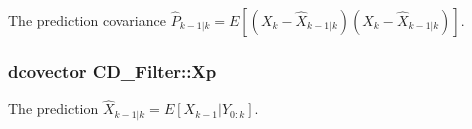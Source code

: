 The prediction covariance $ \hat{P}_{k-1|k}=E[(X_k-\hat{X}_{k-1|k})(X_k-\hat{X}_{k-1|k}) ] $. 

\hypertarget{class_c_d___filter_a72ca0f05fe1359cf61ec5db0e1a3282}{
\subsubsection[{Xp}]{\setlength{\rightskip}{0pt plus 5cm}dcovector {\bf CD\_\-Filter::Xp}}}
\label{class_c_d___filter_a72ca0f05fe1359cf61ec5db0e1a3282}


The prediction $ \hat{X}_{k-1|k}=E[X_{k-1} |Y_{0:k}] $. 

